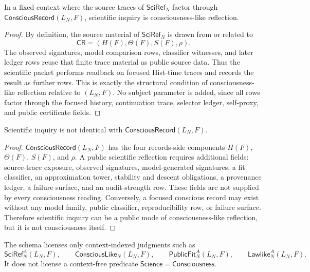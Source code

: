\begin{proposition}
\label{prop:scientific-inquiry-conscious-like-when-focused}
In a fixed context where the source traces of $\mathsf{SciRef}_{N}$
factor through $\mathsf{ConsciousRecord}(L_N,F)$, scientific inquiry is
consciousness-like reflection.
\end{proposition}

\begin{proof}
By definition, the source material of $\mathsf{SciRef}_{N}$ is drawn from
or related to
$$
\mathsf{CR}=(H(F),\Theta(F),S(F),\rho).
$$
The observed signatures, model comparison rows, classifier witnesses, and
later ledger rows reuse that finite trace material as public source data.
Thus the scientific packet performs readback on focused Hist-time traces
and records the result as further rows. This is exactly the structural
condition of consciousness-like reflection relative to $(L_N,F)$. No
subject parameter is added, since all rows factor through the focused
history, continuation trace, selector ledger, self-proxy, and public
certificate fields.
\end{proof}

\begin{proposition}
\label{prop:scientific-inquiry-not-consciousness-itself}
Scientific inquiry is not identical with $\mathsf{ConsciousRecord}(L_N,F)$.
\end{proposition}

\begin{proof}
$\mathsf{ConsciousRecord}(L_N,F)$ has the four records-side components
$H(F)$, $\Theta(F)$, $S(F)$, and $\rho$. A public scientific reflection
requires additional fields: source-trace exposure, observed signatures,
model-generated signatures, a fit classifier, an approximation tower,
stability and descent obligations, a provenance ledger, a failure
surface, and an audit-strength row. These fields are not supplied by
every consciousness reading. Conversely, a focused conscious record may
exist without any model family, public classifier, reproducibility row,
or failure surface. Therefore scientific inquiry can be a public mode of
consciousness-like reflection, but it is not consciousness itself.
\end{proof}

\begin{corollary}
\label{cor:no-deindexed-consciousness-science-predicate}
The schema licenses only context-indexed judgments such as
$$
\mathsf{SciRef}^{A}_{N}(L_N,F),
\qquad
\mathsf{ConsciousLike}_{N}(L_N,F),
\qquad
\mathsf{PublicFit}^{A}_{N}(L_N,F),
\qquad
\mathsf{Lawlike}^{A}_{N}(L_N,F).
$$
It does not license a context-free predicate
$\mathsf{Science}=\mathsf{Consciousness}$.
\end{corollary}

